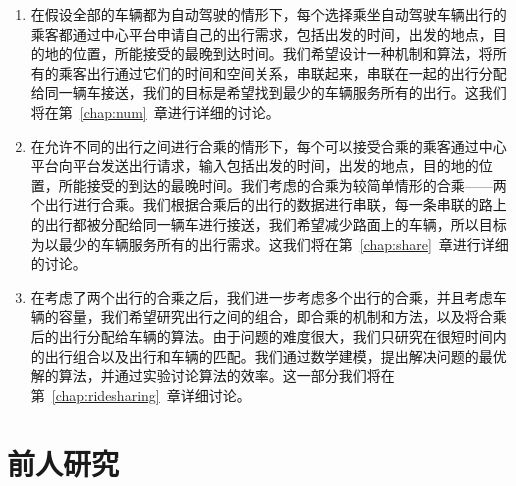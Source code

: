 \begin{enumerate}
\item 在假设全部的车辆都为自动驾驶的情形下，每个选择乘坐自动驾驶车辆出行的乘客都通过中心平台申请自己的出行需求，包括出发的时间，出发的地点，目的地的位置，所能接受的最晚到达时间。我们希望设计一种机制和算法，将所有的乘客出行通过它们的时间和空间关系，串联起来，串联在一起的出行分配给同一辆车接送，我们的目标是希望找到最少的车辆服务所有的出行。这我们将在第~\ref{chap:num}~章进行详细的讨论。
\item 在允许不同的出行之间进行合乘的情形下，每个可以接受合乘的乘客通过中心平台向平台发送出行请求，输入包括出发的时间，出发的地点，目的地的位置，所能接受的到达的最晚时间。我们考虑的合乘为较简单情形的合乘——两个出行进行合乘。我们根据合乘后的出行的数据进行串联，每一条串联的路上的出行都被分配给同一辆车进行接送，我们希望减少路面上的车辆，所以目标为以最少的车辆服务所有的出行需求。这我们将在第~\ref{chap:share}~章进行详细的讨论。
\item 在考虑了两个出行的合乘之后，我们进一步考虑多个出行的合乘，并且考虑车辆的容量，我们希望研究出行之间的组合，即合乘的机制和方法，以及将合乘后的出行分配给车辆的算法。由于问题的难度很大，我们只研究在很短时间内的出行组合以及出行和车辆的匹配。我们通过数学建模，提出解决问题的最优解的算法，并通过实验讨论算法的效率。这一部分我们将在第~\ref{chap:ridesharing}~章详细讨论。
\end{enumerate}

\section{前人研究}
